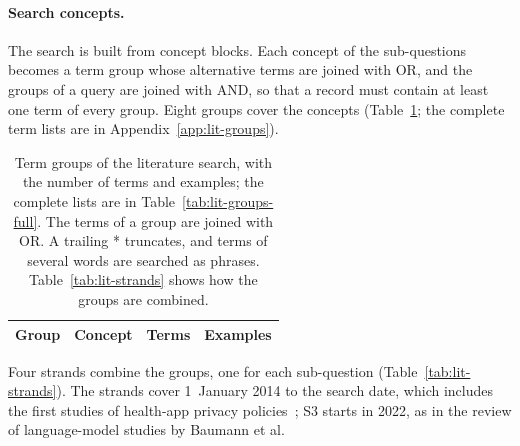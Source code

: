 \paragraph{Search concepts.} The search is built from concept blocks. Each
concept of the sub-questions becomes a term group whose alternative terms are
joined with OR, and the groups of a query are joined with AND, so that a record
must contain at least one term of every group. Eight groups cover the concepts
(Table~\ref{tab:lit-groups}; the complete term lists are in
Appendix~\ref{app:lit-groups}).

\begin{table}[H]
\centering
\begin{singlespace}
\caption[Term groups of the literature search]{Term groups of the literature
search, with the number of terms and examples; the complete lists are in
Table~\ref{tab:lit-groups-full}. The terms of a group are joined with OR. A
trailing * truncates, and terms of several words are searched as phrases.
Table~\ref{tab:lit-strands} shows how the groups are combined.}
\label{tab:lit-groups}
\small
\begin{tabularx}{\textwidth}{@{}l>{\raggedright\arraybackslash}p{3.6cm}r>{\raggedright\arraybackslash}X@{}}
\toprule
\textbf{Group} & \textbf{Concept} & \textbf{Terms} & \textbf{Examples} \\
\midrule
\end{tabularx}
\end{singlespace}
\end{table}

Four strands combine the groups, one for each sub-question
(Table~\ref{tab:lit-strands}). The strands cover 1~January 2014 to the
search date, which includes the first studies of health-app privacy
policies~\parencite{sunyaev2015availability}; S3 starts in 2022, as in the
review of language-model studies by Baumann et al.

